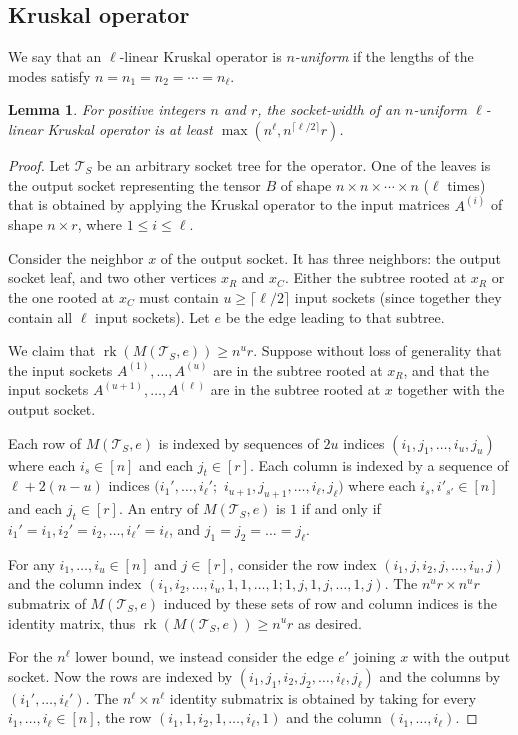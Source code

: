 \documentclass[11pt]{article}
\numberwithin{equation}{section}
\newtheorem{lemma}[theorem]{Lemma}
\theoremstyle{definition}
\theoremstyle{plain}
\newcommand{\rk}{\ensuremath{\operatorname{rk}}}
\newcommand{\ts}{\ensuremath{\mathcal{T}_S}}
\begin{document}
\subsection{Kruskal operator}

We say that an $\ell$-linear Kruskal operator is \emph{$n$-uniform} if
the lengths of the modes satisfy $n=n_1=n_2=\cdots=n_\ell$.

\begin{lemma}
For positive integers $n$ and $r$, the socket-width of an $n$-uniform $\ell$-linear Kruskal operator is at least $\max\left(n^{\ell}, n^{\lceil\ell/2\rceil}r\right)$.
\end{lemma}
\begin{proof}
  Let $\ts$ be an arbitrary socket tree for the
  operator.  One of the leaves is the output socket representing the
  tensor $B$ of shape $n \times n \times \cdots \times n$ ($\ell$
  times) that is obtained by applying the Kruskal operator to the input matrices
  $A^{(i)}$ of shape $n \times r$, where $1 \le i \le \ell$.

  Consider the neighbor $x$ of the output socket.  It has three
  neighbors: the output socket leaf, and two other vertices $x_R$ and
  $x_C$.  Either the subtree rooted at $x_R$ or the one rooted at $x_C$
  must contain $u \geq \lceil \ell/2 \rceil$ input sockets (since
  together they contain all $\ell$ input sockets).  Let $e$ be the
  edge leading to that subtree.

  We claim that $\rk(M(\ts, e)) \ge n^u r$.  Suppose without loss of
  generality that the input sockets $A^{(1)}, \ldots, A^{(u)}$ are in
  the subtree rooted at $x_R$, and that the input sockets $A^{(u+1)},
  \ldots, A^{(\ell)}$ are in the subtree rooted at $x$ together with
  the output socket.

  Each row of $M(\ts, e)$ is indexed by sequences of $2u$ indices $(i_1, j_1, \ldots, i_u, j_u)$ where each
  $i_s \in [n]$ and each $j_t \in [r]$. Each column is indexed by
  a sequence of $\ell + 2(n-u)$ indices $(i_1', \ldots, i_\ell';$ $
  i_{u+1}, j_{u+1}, \ldots, i_{\ell}, j_{\ell})$ where each $i_s, i'_{s'} \in [n]$
  and each $j_t \in [r]$.  An entry of $M(\ts, e)$ is $1$ if
  and only if $i_1' = i_1, i_2' = i_2, \ldots, i_\ell' = i_\ell$, and
  $j_1 = j_2 = \ldots = j_\ell$.

  For any $i_1, \ldots, i_u \in [n]$ and $j \in [r]$, consider the row index $(i_1, j, i_2, j, \ldots, i_u, j)$ and the column
  index $(i_1, i_2, \ldots, i_u, 1, 1, \ldots, 1; 1, j, 1, j, \ldots,
  1, j)$.  The
  $n^u r \times n^ur$ submatrix of $M(\ts, e)$ induced by these sets of
  row and column indices is the identity matrix, thus $\rk(M(\ts, e))
  \ge n^u r$ as desired.

  For the $n^{\ell}$ lower bound, we
  instead consider the edge $e'$ joining $x$ with the output socket.
  Now the rows are indexed by $(i_1, j_1, i_2, j_2, \ldots, i_\ell, j_\ell)$  and the
  columns by $(i_1', \ldots, i_\ell')$.  The
  $n^\ell \times n^\ell$ identity submatrix is obtained by taking for
  every $i_1, \ldots, i_\ell \in [n]$, the row $(i_1, 1, i_2, 1, \ldots, i_\ell, 1)$ and the column $(i_1, \ldots, i_\ell)$.
\end{proof}
\end{document}
